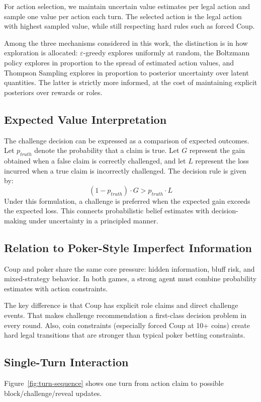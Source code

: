 \documentclass[11pt]{article}
\begin{document}
For action selection, we maintain uncertain value estimates per legal action and sample one value per action each turn. The selected action is the legal action with highest sampled value, while still respecting hard rules such as forced Coup.

Among the three mechanisms considered in this work, the distinction is in how exploration is allocated: $\varepsilon$-greedy explores uniformly at random, the Boltzmann policy explores in proportion to the spread of estimated action values, and Thompson Sampling explores in proportion to posterior uncertainty over latent quantities. The latter is strictly more informed, at the cost of maintaining explicit posteriors over rewards or roles.

\subsection{Expected Value Interpretation}
The challenge decision can be expressed as a comparison of expected outcomes. Let $p_{truth}$ denote the probability that a claim is true. Let $G$ represent the gain obtained when a false claim is correctly challenged, and let $L$ represent the loss incurred when a true claim is incorrectly challenged. The decision rule is given by:
\[
(1 - p_{truth}) \cdot G > p_{truth} \cdot L
\]
Under this formulation, a challenge is preferred when the expected gain exceeds the expected loss. This connects probabilistic belief estimates with decision-making under uncertainty in a principled manner.


\subsection{Relation to Poker-Style Imperfect Information}
Coup and poker share the same core pressure: hidden information, bluff risk, and mixed-strategy behavior. In both games, a strong agent must combine probability estimates with action constraints.

The key difference is that Coup has explicit role claims and direct challenge events. That makes challenge recommendation a first-class decision problem in every round. Also, coin constraints (especially forced Coup at 10+ coins) create hard legal transitions that are stronger than typical poker betting constraints.

\subsection{Single-Turn Interaction}
Figure~\ref{fig:turn-sequence} shows one turn from action claim to possible block/challenge/reveal updates.
\end{document}
